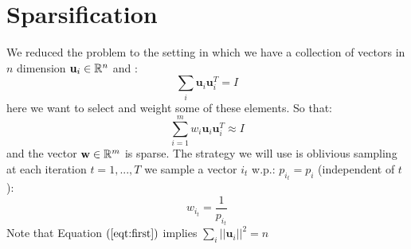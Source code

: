 \documentclass[11pt]{article}
\newcommand{\bu}{\mathbf{u}}
\begin{document}

\section*{Sparsification}
We reduced the problem to the setting in which we have a collection of vectors in $n$ dimension $\bu_i \in \R^n$ and :
\begin{equation}\label{eqt:first}
    \sum_{i}\bu_i\bu_i^T = I
\end{equation}
here we want to select and weight some of these elements. So that:
\[
    \sum_{i=1}^m w_i \bu_i\bu_i^T \approx I
\]
and the vector $\mathbf{w} \in \mathbb{R}^m$ is sparse. The strategy we will use is oblivious sampling at each iteration $t=1, ... ,T$ we sample a vector $i_t$ w.p.: $p_{i_t} = p_i$ (independent of $t$):
\[
    w_{i_t} = \frac{1}{p_{i_t}}
\]
Note that Equation $(\ref{eqt:first})$ implies $\sum_i ||\bu_i||^2 = n$
\end{document}
